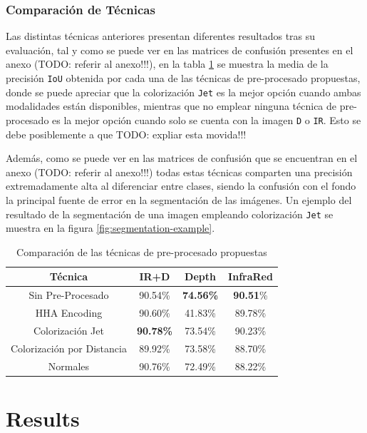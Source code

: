 \documentclass[12pt,a4paper]{report}
\begin{document}
\subsection{Comparación de Técnicas}
\label{subsubsec:techniques_comparison}
Las distintas técnicas anteriores presentan diferentes resultados tras su evaluación, tal y como se puede ver en las matrices de confusión presentes en el anexo (TODO: referir al anexo!!!), en la tabla \ref{tab:techniques_comparison} se muestra la media de la precisión \texttt{IoU} obtenida por cada una de las técnicas de pre-procesado propuestas, donde se puede apreciar que la colorización \texttt{Jet} es la mejor opción cuando ambas modalidades están disponibles, mientras que no emplear ninguna técnica de pre-procesado es la mejor opción cuando solo se cuenta con la imagen \texttt{D} o \texttt{IR}. Esto se debe posiblemente a que TODO: expliar esta movida!!!

Además, como se puede ver en las matrices de confusión que se encuentran en el anexo (TODO: referir al anexo!!!) todas estas técnicas comparten una precisión extremadamente alta al diferenciar entre clases, siendo la confusión con el fondo la principal fuente de error en la segmentación de las imágenes. Un ejemplo del resultado de la segmentación de una imagen empleando colorización \texttt{Jet} se muestra en la figura \ref{fig:segmentation-example}.

\begin{table}[!h]
    \centering
    \begin{tabular}{|c|c|c|c|}
        \hline
        \textbf{Técnica} & \textbf{IR+D} & \textbf{Depth} & \textbf{InfraRed} \\
        \hline
        Sin Pre-Procesado & 90.54\% & \textbf{74.56\%} & \textbf{90.51}\% \\
        HHA Encoding & 90.60\% &  41.83\% &  89.78\%\\
        Colorización Jet & \textbf{90.78\%} & 73.54\% & 90.23\%\\
        Colorización por Distancia & 89.92\% & 73.58\% & 88.70\%\\
        Normales & 90.76\% & 72.49\% & 88.22\%\\
        \hline
    \end{tabular}
    \caption{Comparación de las técnicas de pre-procesado propuestas}
    \label{tab:techniques_comparison}
\end{table}

\chapter{Results}
\label{chap:results}




\appendix
\label{app:appendix_a}
\end{document}
